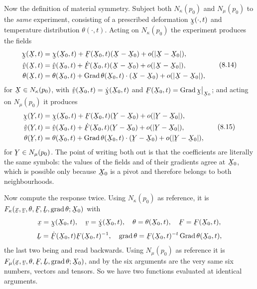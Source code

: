 Now the definition of material symmetry. Subject both
$N_{\kappa}(p_{0})$ and $N_{\mu}(p_{0})$ to the \emph{same} experiment,
consisting of a prescribed deformation $\bchi(\cdot,t)$ and temperature
distribution $\theta(\cdot,t)$. Acting on $N_{\kappa}(p_{0})$ the
experiment produces the fields
\begin{equation}
\begin{aligned}
   \bchi(\bX,t)&=\bchi(\bX_{0},t)+\bF(\bX_{0},t)(\bX-\bX_{0})
     +o(|\bX-\bX_{0}|),\\
   \hat\bv(\bX,t)&=\hat\bv(\bX_{0},t)+\dot\bF(\bX_{0},t)(\bX-\bX_{0})
     +o(|\bX-\bX_{0}|),\\
   \theta(\bX,t)&=\theta(\bX_{0},t)
     +\ip{\Grad\theta(\bX_{0},t)}{(\bX-\bX_{0})}+o(|\bX-\bX_{0}|),
\end{aligned}
   \tag{8.14}\label{eq:8.14}
\end{equation}
for $\bX\in N_{\kappa}(p_{0})$, with $\hat\bv(\bX_{0},t)=
\dot\bchi(\bX_{0},t)$ and $\bF(\bX_{0},t)=\Grad\bchi\rest{\bX_{0}}$;
and acting on $N_{\mu}(p_{0})$ it produces
\begin{equation}
\begin{aligned}
   \bchi(\bY,t)&=\bchi(\bX_{0},t)+\bF(\bX_{0},t)(\bY-\bX_{0})
     +o(|\bY-\bX_{0}|),\\
   \hat\bv(\bY,t)&=\hat\bv(\bX_{0},t)+\dot\bF(\bX_{0},t)(\bY-\bX_{0})
     +o(|\bY-\bX_{0}|),\\
   \theta(\bY,t)&=\theta(\bX_{0},t)
     +\ip{\Grad\theta(\bX_{0},t)}{(\bY-\bX_{0})}+o(|\bY-\bX_{0}|),
\end{aligned}
   \tag{8.15}\label{eq:8.15}
\end{equation}
for $\bY\in N_{\mu}(p_{0})$. The point of writing both out is that the
coefficients are literally the same symbols: the values of the fields
and of their gradients agree at $\bX_{0}$, which is possible only
because $\bX_{0}$ is a pivot and therefore belongs to both
neighbourhoods.

Now compute the response twice. Using $N_{\kappa}(p_{0})$ as reference,
it is $F_{\kappa}(\bx,\bv,\theta,\bF,\bL,\grad\theta;\bX_{0})$ with
\[
   \bx=\bchi(\bX_{0},t),\quad
   \bv=\dot\bchi(\bX_{0},t),\quad
   \theta=\theta(\bX_{0},t),\quad
   \bF=\bF(\bX_{0},t),
\]
\[
   \bL=\dot\bF(\bX_{0},t)\bF(\bX_{0},t)^{-1},\quad
   \grad\theta=\bF(\bX_{0},t)^{-t}\Grad\theta(\bX_{0},t),
\]
the last two being  and  read backwards. Using
$N_{\mu}(p_{0})$ as reference it is
$F_{\mu}(\bx,\bv,\theta,\bF,\bL,\grad\theta;\bX_{0})$, and by
 the six arguments are the very same six numbers, vectors and
tensors. So we have two functions evaluated at identical arguments.

